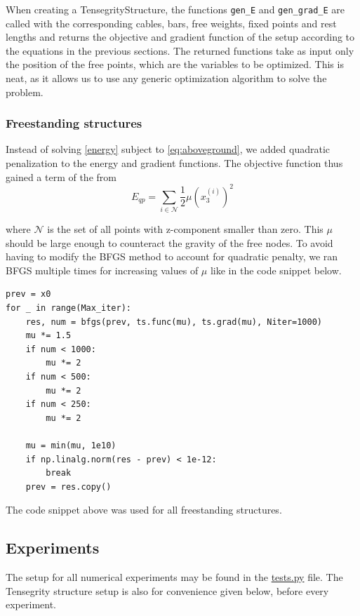When creating a TensegrityStructure, the functions \lstinline{gen_E}  and \lstinline{gen_grad_E} are called with the corresponding cables, bars, free weights, fixed points and rest lengths and returns the objective and gradient function of the setup according to the equations in the previous sections. The returned functions take as input only the position of the free points, which are the variables to be optimized. This is neat, as it allows us to use any generic optimization algorithm to solve the problem.

\subsubsection{Freestanding structures}
Instead of solving \eqref{energy} subject to \eqref{eq:aboveground}, we added quadratic penalization to the energy and gradient functions. The objective function thus gained a term of the from 
\begin{equation}
    E_{qp} = \sum_{i \in \mathcal{N}} \frac{1}{2} \mu (x_3^{(i)})^2
\end{equation}

where $\mathcal{N}$ is the set of all points with z-component smaller than zero. This $\mu$ should be large enough to counteract the gravity of the free nodes. To avoid having to modify the BFGS method to account for quadratic penalty, we ran BFGS multiple times for increasing values of $\mu$ like in the code snippet below.

\begin{lstlisting}
prev = x0
for _ in range(Max_iter):
    res, num = bfgs(prev, ts.func(mu), ts.grad(mu), Niter=1000)
    mu *= 1.5
    if num < 1000:
        mu *= 2
    if num < 500:
        mu *= 2
    if num < 250:
        mu *= 2

    mu = min(mu, 1e10)
    if np.linalg.norm(res - prev) < 1e-12:
        break
    prev = res.copy()
\end{lstlisting}
The code snippet above was used for all freestanding structures.
 
\subsection{Experiments}
The setup for all numerical experiments may be found in the \href{https://github.com/otkulseng/Opt1_Project/blob/main/Kode/tests.py}{tests.py} file. The Tensegrity structure setup is also for convenience given below, before every experiment.
